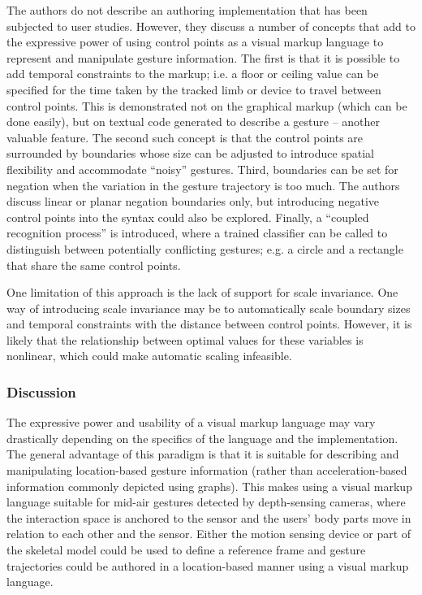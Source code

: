 The authors do not describe an authoring implementation that has been subjected to user studies. However, they discuss a number of concepts that add to the expressive power of using control points as a visual markup language to represent and manipulate gesture information. The first is that it is possible to add temporal constraints to the markup; i.e. a floor or ceiling value can be specified for the time taken by the tracked limb or device to travel between control points. This is demonstrated not on the graphical markup (which can be done easily), but on textual code generated to describe a gesture – another valuable feature. The second such concept is that the control points are surrounded by boundaries whose size can be adjusted to introduce spatial flexibility and accommodate “noisy” gestures. Third, boundaries can be set for negation when the variation in the gesture trajectory is too much. The authors discuss linear or planar negation boundaries only, but introducing negative control points into the syntax could also be explored. Finally, a “coupled recognition process” is introduced, where a trained classifier can be called to distinguish between potentially conflicting gestures; e.g. a circle and a rectangle that share the same control points.

One limitation of this approach is the lack of support for scale invariance. One way of introducing scale invariance may be to automatically scale boundary sizes and temporal constraints with the distance between control points. However, it is likely that the relationship between optimal values for these variables is nonlinear, which could make automatic scaling infeasible.

\subsubsection{Discussion}

The expressive power and usability of a visual markup language may vary drastically depending on the specifics of the language and the implementation. The general advantage of this paradigm is that it is suitable for describing and manipulating location-based gesture information (rather than acceleration-based information commonly depicted using graphs). This makes using a visual markup language suitable for mid-air gestures detected by depth-sensing cameras, where the interaction space is anchored to the sensor and the users' body parts move in relation to each other and the sensor. Either the motion sensing device or part of the skeletal model could be used to define a reference frame and gesture trajectories could be authored in a location-based manner using a visual markup language.

